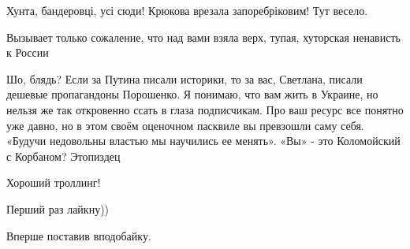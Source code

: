 \begin{itemize}
Хунта, бандеровці, усі сюди! Крюкова врезала запоребріковим! Тут весело.

 
Вызывает только сожаление, что над вами взяла верх, тупая, хуторская ненависть к России🙁

 

Шо, блядь? Если за Путина писали историки, то за вас, Светлана, писали дешевые
пропагандоны Порошенко. Я понимаю, что вам жить в Украине, но нельзя же так
откровенно ссать в глаза подписчикам. Про ваш ресурс все понятно уже давно, но
в этом своём оценочном пасквиле вы превзошли саму себя. «Будучи недовольны
властью мы научились ее менять». «Вы» - это Коломойский с Корбаном? Этопиздец


 
Хороший троллинг!

 
Перший раз лайкну))

 
Вперше поставив вподобайку.

 

\end{itemize}
